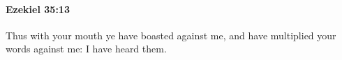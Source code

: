 
		\paragraph{Ezekiel 35:13} %
			\label{EZEKIEL-35-13}

			Thus with your mouth ye have boasted against me, and have multiplied your words against me: I have heard them.


